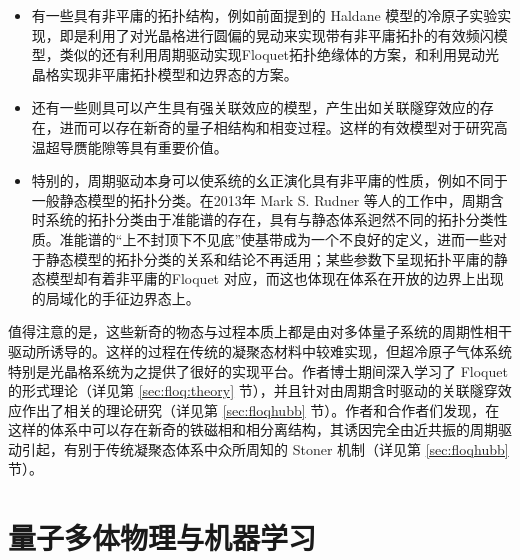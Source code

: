 \begin{itemize}

\item 有一些具有非平庸的拓扑结构，例如前面提到的 Haldane 模型的冷原子实验实现\cite{haldane-expr-2014}，即是利用了对光晶格进行圆偏的晃动来实现带有非平庸拓扑的有效频闪模型\cite{oka2009}，类似的还有利用周期驱动实现Floquet拓扑绝缘体的方案\cite{floq-ti-2011}，和利用晃动光晶格实现非平庸拓扑模型和边界态的方案\cite{zhengwei-floquet-2014}。

\item 还有一些则具可以产生具有强关联效应的模型，产生出如关联隧穿效应的存在\cite{correlated-tunnel-expr-2018-shaking,correlated-tunnel-expr-2018-raman}，进而可以存在新奇的量子相结构和相变过程\cite{floqhubb}。这样的有效模型对于研究高温超导赝能隙等具有重要价值。

\item 特别的，周期驱动本身可以使系统的幺正演化具有非平庸的性质，例如不同于一般静态模型的拓扑分类\cite{floq-edgestate-2013-prx}。在2013年 Mark S. Rudner 等人的工作中，周期含时系统的拓扑分类由于准能谱的存在，具有与静态体系迥然不同的拓扑分类性质。准能谱的“上不封顶下不见底”使基带成为一个不良好的定义，进而一些对于静态模型的拓扑分类\cite{topoclassify2016}的关系和结论不再适用；某些参数下呈现拓扑平庸的静态模型却有着非平庸的Floquet 对应，而这也体现在体系在开放的边界上出现的局域化的手征边界态上。

\end{itemize}

值得注意的是，这些新奇的物态与过程本质上都是由对多体量子系统的周期性相干驱动所诱导的。这样的过程在传统的凝聚态材料中较难实现，但超冷原子气体系统特别是光晶格系统为之提供了很好的实现平台。作者博士期间深入学习了 Floquet 的形式理论（详见第 \ref{sec:floq:theory} 节），并且针对由周期含时驱动的关联隧穿效应作出了相关的理论研究（详见第 \ref{sec:floqhubb} 节）。作者和合作者们发现，在这样的体系中可以存在新奇的铁磁相和相分离结构，其诱因完全由近共振的周期驱动引起，有别于传统凝聚态体系中众所周知的 Stoner 机制（详见第 \ref{sec:floqhubb} 节）。





\section{量子多体物理与机器学习}

